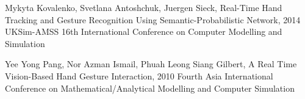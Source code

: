 \documentclass[11pt]{report}
\begin{document}
\begin{thebibliography}{999}
    \bibitem{} Mykyta Kovalenko, Svetlana Antoshchuk, Juergen Sieck, Real-Time Hand Tracking and Gesture Recognition Using Semantic-Probabilistic Network, 2014 UKSim-AMSS 16th International Conference on Computer Modelling and Simulation
    
    \bibitem{} Yee Yong Pang, Nor Azman Ismail, Phuah Leong Siang Gilbert, A Real Time Vision-Based Hand Gesture Interaction, 2010 Fourth Asia International Conference on Mathematical/Analytical Modelling and Computer Simulation
    



\end{thebibliography}
\end{document}
